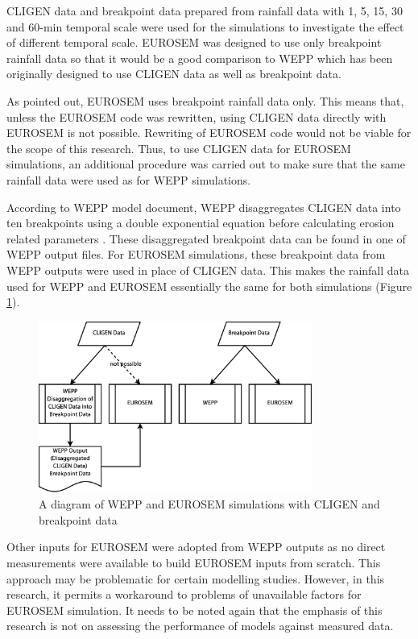 CLIGEN data and breakpoint data prepared from rainfall data with 1, 5, 15,
30 and 60-min temporal scale were used for the simulations to investigate the
effect of different temporal scale.
EUROSEM was designed to use only breakpoint rainfall data so that it would
be a good comparison to WEPP which has been originally designed to use CLIGEN
data as well as breakpoint data.

As pointed out, EUROSEM uses breakpoint rainfall data only. This means that,
unless the EUROSEM code was rewritten, using CLIGEN data directly with EUROSEM
is not possible. Rewriting of EUROSEM code would not be viable for the scope of
this research. Thus, to use CLIGEN data for EUROSEM simulations, an additional
procedure was carried out to make sure that the same rainfall data were used as
for WEPP simulations.

According to WEPP model document, WEPP disaggregates CLIGEN data into ten
breakpoints using a double exponential equation before calculating erosion
related parameters \citep[see][\S 2.2]{flanagan1995-usda}. These disaggregated
breakpoint data can be found in one of WEPP output files. For EUROSEM
simulations, these breakpoint data from WEPP outputs were used in place of
CLIGEN data. This makes the rainfall data used for WEPP and EUROSEM essentially
the same for both simulations (Figure \ref{fig:eurosem_cligen_workaround}).

\begin{figure}[htbp]
  \centering
    \includegraphics[width=0.8\textwidth]{./img/eurosem_cligen_workaround}
  \caption{A diagram of WEPP and EUROSEM simulations with CLIGEN and breakpoint
data}
  \label{fig:eurosem_cligen_workaround}
\end{figure}

Other inputs for EUROSEM were adopted from WEPP outputs as no direct
measurements were available to build EUROSEM inputs from scratch. This approach
may be problematic for certain modelling studies. However, in this research, it
permits a workaround to problems of unavailable factors for EUROSEM simulation.
It needs to be noted again that the emphasis of this research is not on
assessing the performance of models against measured data.

